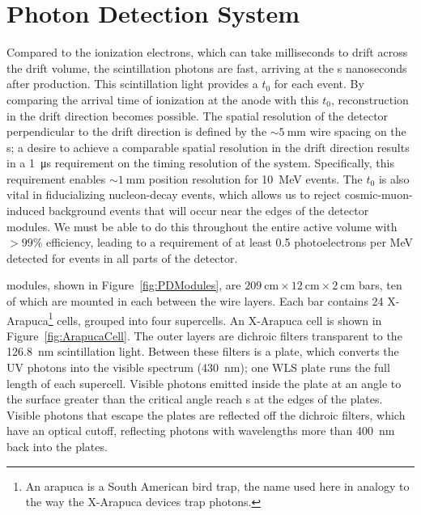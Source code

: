 \section{Photon Detection System}
\label{sec:fdsp-exec-pds}

Compared to the ionization electrons, which can take milliseconds to drift across the drift volume, the scintillation photons are fast, arriving at the s nanoseconds after production. This scintillation light provides a $t_{0}$ for each event. By comparing the arrival time of ionization at the anode with this $t_{0}$, reconstruction in the drift direction becomes possible. The spatial resolution of the detector perpendicular to the drift direction is defined by the $\sim\!\SI{5}{\mm}$ wire spacing on the s; a desire to achieve a comparable spatial resolution in the drift direction results in a \SI{1}{\micro\second} requirement on the timing resolution of the  system. Specifically, this requirement enables $\sim\!\SI{1}{\mm}$ position resolution for \SI{10}{\mega\electronvolt}  events. The  $t_{0}$ is also vital in fiducializing nucleon-decay events, which allows us to reject cosmic-muon-induced background events that will occur near the edges of the detector modules. We must be able to do this throughout the entire active volume with $>\!99\%$ efficiency, leading to a requirement of at least 0.5 photoelectrons per MeV detected for events in all parts of the detector.

 modules, shown in Figure~\ref{fig:PDModules}, are %
$\SI{209}{\cm}\times\SI{12}{\cm}\times\SI{2}{\cm}$ bars, ten of which are mounted in each  between the wire layers. Each bar contains 24 X-Arapuca\footnote{An arapuca is a South American bird trap, the name used here in analogy to the way the X-Arapuca devices trap photons.} cells, grouped into four supercells. An X-Arapuca cell is shown in Figure~\ref{fig:ArapucaCell}. The outer layers are dichroic filters transparent to the \SI{126.8}{\nano\meter} scintillation light. Between these filters is a  plate, which converts the UV photons into the visible spectrum (\SI{430}{\nano\meter}); one WLS plate runs the full length of each supercell.
Visible photons emitted inside the  plate at an angle to the surface greater than the critical angle reach s at the edges of the plates. Visible photons that escape the  plates are reflected off the dichroic filters, which have an optical cutoff, reflecting photons with wavelengths more than \SI{400}{\nano\meter} back into the  plates.


